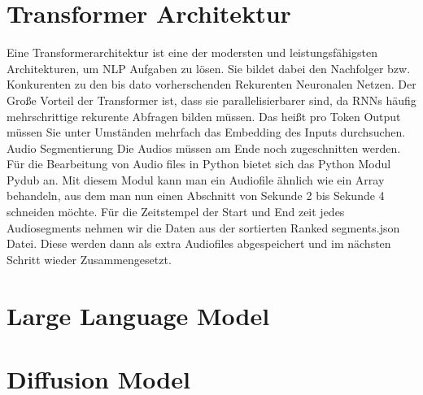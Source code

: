 \section{Transformer Architektur}


Eine Transformerarchitektur ist eine der modersten und leistungsfähigsten Architekturen, um NLP Aufgaben zu lösen. Sie bildet dabei den Nachfolger bzw. Konkurenten zu den bis dato vorherschenden Rekurenten Neuronalen Netzen. Der Große Vorteil der Transformer ist, dass sie parallelisierbarer sind, da RNNs häufig mehrschrittige rekurente Abfragen bilden müssen. Das heißt pro Token Output müssen Sie unter Umständen mehrfach das Embedding des Inputs durchsuchen. Audio Segmentierung Die Audios müssen am Ende noch zugeschnitten werden. 
Für die Bearbeitung von Audio files in Python bietet sich das Python Modul Pydub an. Mit diesem Modul kann man ein Audiofile ähnlich wie ein Array behandeln, aus dem man nun einen Abschnitt von Sekunde 2 bis Sekunde 4 schneiden möchte. 
Für die Zeitstempel der Start und End zeit jedes Audiosegments nehmen wir die Daten aus der sortierten Ranked segments.json Datei.
Diese werden dann als extra Audiofiles abgespeichert und im nächsten Schritt wieder Zusammengesetzt.

\section{Large Language Model}

\section{Diffusion Model}